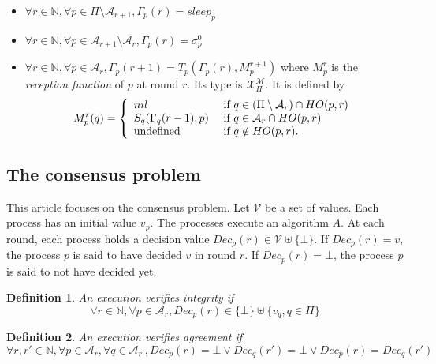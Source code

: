 \documentclass{article}
\newtheorem{definition}{Definition}
\begin{document}
\begin{itemize}
	\item $\forall r \in \mathds{N}, \forall p \in \Pi \setminus \mathcal{A}_{r+1}, \Gamma_p(r) = sleep_p$
	\item $\forall r \in \mathds{N}, \forall p \in \mathcal{A}_{r+1} \setminus \mathcal{A}_r,
		\Gamma_p(r) = \sigma^0_p$
	\item $\forall r \in \mathds{N}, \forall p \in \mathcal{A}_r, \Gamma_p(r+1) = T_p(\Gamma_p(r), M_p^{r+1})$
		where $M_p^r$ is the \textit{reception function} of $p$ at round $r$.
		Its type is $\mathcal{X}_\Pi^{\mathcal{M}}$.
		It is defined by
			$$ M_p^r(q) = \left \{ \begin{array}{l l}
	                         nil  & \mbox{ if  } q \in (\Pi \setminus \mathcal{A}_r  ) \cap  HO(p,r)  \\
	                         S_q (\Gamma_q(r-1), p)  & \mbox{ if  }   q \in \mathcal{A}_r  \cap  HO(p,r) \\
	                         \mbox{undefined} & \mbox{ if  }   q \notin  HO(p,r) .
	                          \end{array} \right.$$ 
\end{itemize}

\subsection{The consensus problem}

This article focuses on the consensus problem. Let $\mathcal{V}$ be a set of values. Each process has an 
initial value $v_p$. The processes execute an algorithm $A$. At each round, each process holds a decision value
$Dec_p(r) \in \mathcal{V} \uplus \{\bot\}$. If $Dec_p(r) = v$, the process $p$ is said to have decided $v$
in round $r$. If $Dec_p(r) = \bot$, the process $p$ is said to not have decided yet.

\begin{definition}
	An execution verifies integrity if 
	$$\forall r \in \mathds{N}, \forall p \in \mathcal{A}_r, Dec_p(r) \in \{\bot\} \uplus \{v_q, q \in \Pi\}$$
\end{definition}

\begin{definition}
	An execution verifies agreement if 
	$$\forall r, r' \in \mathds{N}, \forall p \in \mathcal{A}_r, \forall q \in \mathcal{A}_{r'},
	Dec_p(r) = \bot \vee Dec_q(r') = \bot \vee Dec_p(r) = Dec_q(r') $$
\end{definition}
\end{document}
